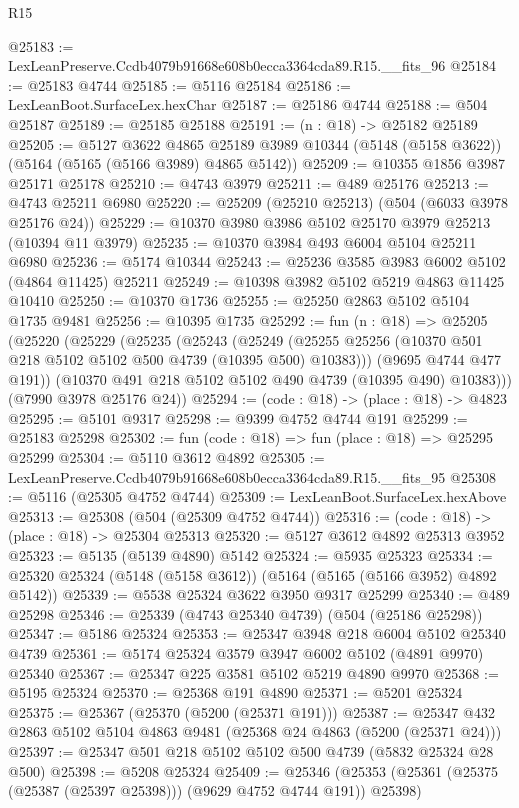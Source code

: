 \begin{lexlean}{R15}
\begin{coremodule}
{{{{{{{{{{{@25183 := LexLeanPreserve.Ccdb4079b91668e608b0ecca3364cda89.R15.__fits_96
@25184 := @25183 @4744
@25185 := @5116 @25184
@25186 := LexLeanBoot.SurfaceLex.hexChar
@25187 := @25186 @4744
@25188 := @504 @25187
@25189 := @25185 @25188
@25191 := (n : @18) -> @25182 @25189
@25205 := @5127
    @3622
    @4865
    @25189
    @3989
    @10344
    (@5148 (@5158 @3622))
    (@5164 (@5165 (@5166 @3989) @4865 @5142))
@25209 := @10355 @1856 @3987 @25171 @25178
@25210 := @4743 @3979
@25211 := @489 @25176
@25213 := @4743 @25211 @6980
@25220 := @25209 (@25210 @25213) (@504 (@6033 @3978 @25176 @24))
@25229 := @10370 @3980 @3986 @5102 @25170 @3979 @25213 (@10394 @11 @3979)
@25235 := @10370 @3984 @493 @6004 @5104 @25211 @6980
@25236 := @5174 @10344
@25243 := @25236 @3585 @3983 @6002 @5102 (@4864 @11425) @25211
@25249 := @10398 @3982 @5102 @5219 @4863 @11425 @10410
@25250 := @10370 @1736
@25255 := @25250 @2863 @5102 @5104 @1735 @9481
@25256 := @10395 @1735
@25292 := fun (n : @18) =>
  @25205
    (@25220
      (@25229
        (@25235
          (@25243
            (@25249 (@25255 @25256 (@10370 @501 @218 @5102 @5102 @500 @4739 (@10395 @500) @10383)))
            (@9695 @4744 @477 @191))
          (@10370 @491 @218 @5102 @5102 @490 @4739 (@10395 @490) @10383)))
      (@7990 @3978 @25176 @24))
@25294 := (code : @18) -> (place : @18) -> @4823
@25295 := @5101 @9317
@25298 := @9399 @4752 @4744 @191
@25299 := @25183 @25298
@25302 := fun (code : @18) => fun (place : @18) => @25295 @25299
@25304 := @5110 @3612 @4892
@25305 := LexLeanPreserve.Ccdb4079b91668e608b0ecca3364cda89.R15.__fits_95
@25308 := @5116 (@25305 @4752 @4744)
@25309 := LexLeanBoot.SurfaceLex.hexAbove
@25313 := @25308 (@504 (@25309 @4752 @4744))
@25316 := (code : @18) -> (place : @18) -> @25304 @25313
@25320 := @5127 @3612 @4892 @25313 @3952
@25323 := @5135 (@5139 @4890) @5142
@25324 := @5935 @25323
@25334 := @25320 @25324 (@5148 (@5158 @3612)) (@5164 (@5165 (@5166 @3952) @4892 @5142))
@25339 := @5538 @25324 @3622 @3950 @9317 @25299
@25340 := @489 @25298
@25346 := @25339 (@4743 @25340 @4739) (@504 (@25186 @25298))
@25347 := @5186 @25324
@25353 := @25347 @3948 @218 @6004 @5102 @25340 @4739
@25361 := @5174 @25324 @3579 @3947 @6002 @5102 (@4891 @9970) @25340
@25367 := @25347 @225 @3581 @5102 @5219 @4890 @9970
@25368 := @5195 @25324
@25370 := @25368 @191 @4890
@25371 := @5201 @25324
@25375 := @25367 (@25370 (@5200 (@25371 @191)))
@25387 := @25347 @432 @2863 @5102 @5104 @4863 @9481 (@25368 @24 @4863 (@5200 (@25371 @24)))
@25397 := @25347 @501 @218 @5102 @5102 @500 @4739 (@5832 @25324 @28 @500)
@25398 := @5208 @25324
@25409 := @25346 (@25353 (@25361 (@25375 (@25387 (@25397 @25398))) (@9629 @4752 @4744 @191)) @25398)
}}}}}}}}}}}
\end{coremodule}
\end{lexlean}
